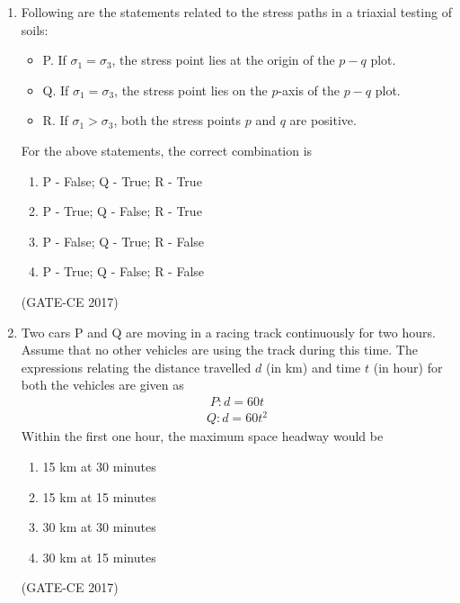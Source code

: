 \documentclass[journal,12pt,onecolumn]{article}
\theoremstyle{remark}
\begin{document}
\begin{enumerate}
    \item Following are the statements related to the stress paths in a triaxial testing of soils:
    \begin{itemize}
        \item P. If $ \sigma_1 = \sigma_3 $, the stress point lies at the origin of the $ p-q $ plot.  
        \item Q. If $ \sigma_1 = \sigma_3 $, the stress point lies on the $ p $-axis of the $ p-q $ plot.  
        \item R. If $ \sigma_1 > \sigma_3 $, both the stress points $ p $ and $ q $ are positive.  
    \end{itemize}
    For the above statements, the correct combination is
    \begin{enumerate}
        \item P - False; Q - True; R - True  
        \item P - True; Q - False; R - True  
        \item P - False; Q - True; R - False  
        \item P - True; Q - False; R - False  
    \end{enumerate}
    \hfill (GATE-CE 2017)

    \item Two cars P and Q are moving in a racing track continuously for two hours. Assume that no other vehicles are using the track during this time. The expressions relating the distance travelled $ d $ (in km) and time $ t $ (in hour) for both the vehicles are given as
    \begin{align}
    P: d = 60t
    \end{align}
    \begin{align}
     Q: d = 60t^2
    \end{align}
    Within the first one hour, the maximum space headway would be
    \begin{multicols}{2}
    \begin{enumerate}
        \item 15 km at 30 minutes  
        \item 15 km at 15 minutes  
        \item 30 km at 30 minutes  
        \item 30 km at 15 minutes  
    \end{enumerate}
    \end{multicols}
    \hfill (GATE-CE 2017)


\end{enumerate}
\end{document}
